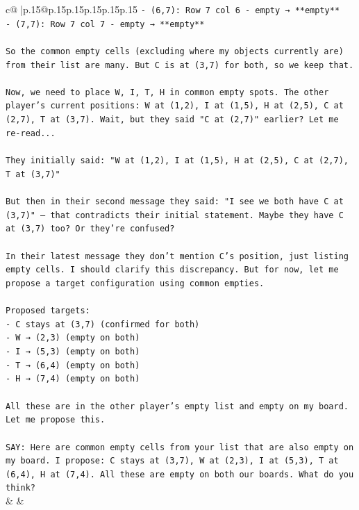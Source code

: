 \documentclass{article}
\begin{document}
{\begin{supertabular}{c@{$\;$}|p{.15\linewidth}@{}p{.15\linewidth}p{.15\linewidth}p{.15\linewidth}p{.15\linewidth}p{.15\linewidth}}
{{{\texttt{{-} (6,7): Row 7 col 6 {-} empty → **empty**} \\
\texttt{{-} (7,7): Row 7 col 7 {-} empty → **empty**} \\
\\ 
\texttt{So the common empty cells (excluding where my objects currently are) from their list are many. But C is at (3,7) for both, so we keep that.} \\
\\ 
\texttt{Now, we need to place W, I, T, H in common empty spots. The other player's current positions: W at (1,2), I at (1,5), H at (2,5), C at (2,7), T at (3,7). Wait, but they said "C at (2,7)" earlier? Let me re{-}read...} \\
\\ 
\texttt{They initially said: "W at (1,2), I at (1,5), H at (2,5), C at (2,7), T at (3,7)"} \\
\\ 
\texttt{But then in their second message they said: "I see we both have C at (3,7)" — that contradicts their initial statement. Maybe they have C at (3,7) too? Or they're confused?} \\
\\ 
\texttt{In their latest message they don't mention C's position, just listing empty cells. I should clarify this discrepancy. But for now, let me propose a target configuration using common empties.} \\
\\ 
\texttt{Proposed targets:} \\
\texttt{{-} C stays at (3,7) (confirmed for both)} \\
\texttt{{-} W → (2,3) (empty on both)} \\
\texttt{{-} I → (5,3) (empty on both)} \\
\texttt{{-} T → (6,4) (empty on both)} \\
\texttt{{-} H → (7,4) (empty on both)} \\
\\ 
\texttt{All these are in the other player's empty list and empty on my board. Let me propose this.} \\
\\ 
\texttt{SAY: Here are common empty cells from your list that are also empty on my board. I propose: C stays at (3,7), W at (2,3), I at (5,3), T at (6,4), H at (7,4). All these are empty on both our boards. What do you think?} \\
            }
        }
    }
    & & \\ \\


\end{supertabular}}
\end{document}
